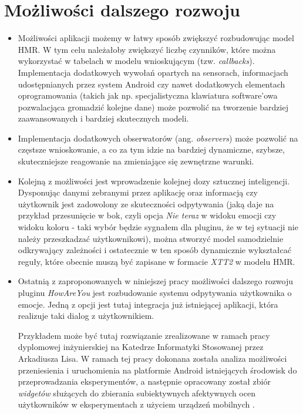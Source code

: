 
\section{Możliwości dalszego rozwoju}
\label{sec:mozwliwosciDalszegoRozwoju}


\begin{itemize}
	\item Możliwości aplikacji możemy w łatwy sposób zwiększyć rozbudowując model HMR. W tym celu należałoby zwiększyć liczbę czynników, które można wykorzystać w tabelach w modelu wnioskującym (tzw. \textit{callbacks}). Implementacja dodatkowych wywołań opartych na sensorach, informacjach udostępnianych przez system Android czy nawet dodatkowych elementach oprogramowania (takich jak np. specjalistyczna klawiatura software'owa pozwalacjąca gromadzić kolejne dane) może pozwolić na tworzenie bardziej zaawansowanych i bardziej skutecznych modeli.
	
	\item Implementacja dodatkowych obserwatorów (ang. \textit{observers}) może pozwolić na częstsze wnioskowanie, a co za tym idzie na bardziej dynamiczne, szybsze, skuteczniejsze reagowanie na zmieniające się zewnętrzne warunki.
	
	\item Kolejną z możliwości jest wprowadzenie kolejnej dozy sztucznej inteligencji. Dysponując danymi zebranymi przez aplikację oraz informacją czy użytkownik jest zadowolony ze skuteczności odpytywania (jaką daje na przykład przesunięcie w bok, czyli opcja \textit{Nie teraz} w widoku emocji czy widoku koloru - taki wybór będzie sygnałem dla pluginu, że w tej sytuacji nie należy przeszkadzać użytkownikowi), można stworzyć model samodzielnie odkrywający zależności i ostatecznie w ten sposób dynamicznie wykształcać reguły, które obecnie muszą być zapisane w formacie \textit{XTT2} w modelu HMR.
	
 	\item Ostatnią z zaproponowanych w niniejszej pracy możliwości dalszego rozwoju pluginu \textit{HowAreYou} jest rozbudowanie systemu odpytywania użytkownika o emocje. Jedną z opcji jest tutaj integracja już istniejącej aplikacji, która realizuje taki dialog z użytkownikiem. 
 	
 	Przykładem może być tutaj rozwiązanie zrealizowane w ramach pracy dyplomowej inżynierskiej na Katedrze Informatyki Stosowanej przez Arkadiusza Lisa. W ramach tej pracy dokonana została analiza możliwości przeniesienia i uruchomienia na platformie Android istniejących środowisk do przeprowadzania eksperymentów, a następnie	opracowany został zbiór \textit{widgetów} służących do zbierania subiektywnych afektywnych ocen użytkowników w eksperymentach z użyciem urządzeń mobilnych \cite{ArkadiuszLis}.
 	

\end{itemize}
